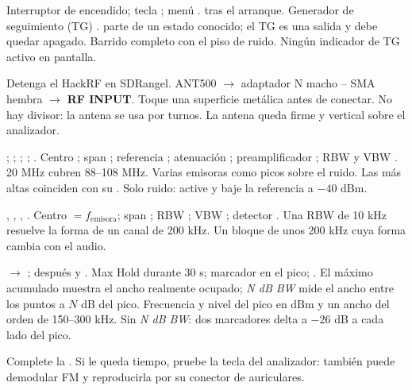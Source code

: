 
{Interruptor de encendido; tecla ; menú .}
{ tras el arranque. Generador de seguimiento (TG) .}
{ parte de un estado conocido; el TG es una salida y debe quedar apagado.}
{Barrido completo con el piso de ruido.}
{Ningún indicador de TG activo en pantalla.}
{}

{Detenga el HackRF en SDRangel. ANT500 $\rightarrow$ adaptador N macho -- SMA hembra $\rightarrow$ \textbf{RF INPUT}.}
{Toque una superficie metálica antes de conectar.}
{No hay divisor: la antena se usa por turnos.}
{La antena queda firme y vertical sobre el analizador.}
{}
{}

{; ; ; ; .}
{Centro ; span ; referencia ; atenuación ; preamplificador ; RBW y VBW .}
{20 MHz cubren 88--108 MHz.}
{Varias emisoras como picos sobre el ruido.}
{Las más altas coinciden con su .}
{Solo ruido: active  y baje la referencia a $-40$ dBm.}

{, , , .}
{Centro $= f_{\mathrm{emisora}}$; span ; RBW ; VBW ; detector .}
{Una RBW de 10 kHz resuelve la forma de un canal de 200 kHz.}
{Un bloque de unos 200 kHz cuya forma cambia con el audio.}
{}
{}

{ $\rightarrow$ ; después  y .}
{Max Hold durante 30 s; marcador en el pico; .}
{El máximo acumulado muestra el ancho realmente ocupado; \emph{N dB BW} mide el ancho entre los puntos a $N$ dB del pico.}
{Frecuencia y nivel del pico en dBm y un ancho del orden de 150--300 kHz.}
{}
{Sin \emph{N dB BW}: dos marcadores delta a $-26$ dB a cada lado del pico.}

Complete la . Si le queda tiempo, pruebe la tecla  del analizador: también puede demodular FM y reproducirla por su conector de auriculares.

